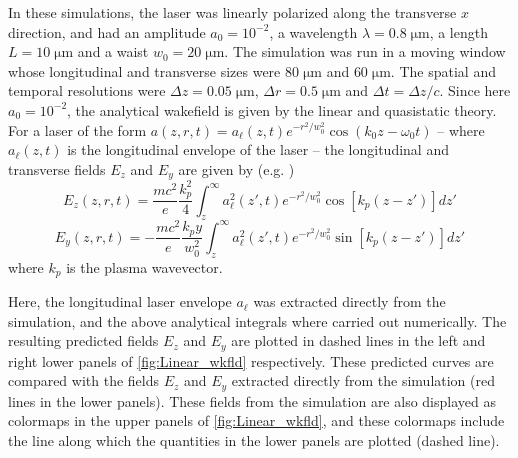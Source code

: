 \documentclass[1p,times,authoryear]{elsarticle}
\begin{document}
In these simulations, the laser was linearly polarized along the
transverse $x$ direction, and had an amplitude $a_0 = 10^{-2}$, a
wavelength $\lambda=0.8 \;\mathrm{\mu m}$, a length $L=10\;\mathrm{\mu
m}$ and a waist $w_0 = 20\;\mathrm{\mu m}$. The simulation was run in
a moving window whose longitudinal and transverse sizes were $80 \;
\mathrm{\mu m}$ and $60 \; \mathrm{\mu m}$. The spatial and temporal
resolutions were $\Delta z = 0.05 \; \mathrm{\mu m}$, $\Delta r = 0.5
\;\mathrm{\mu m}$ and $\Delta t = \Delta z/c$. Since here $a_0 =
10^{-2}$, the analytical wakefield is given by
the linear and quasistatic theory. For a laser of the
form $a(z, r, t)= a_\ell(z, t) e^{-r^2/w_0^2} \cos(k_0z-\omega_0 t)$ --
where $a_\ell(z, t)$ is the longitudinal envelope of the laser -- the
longitudinal and transverse fields $E_z$ and $E_y$ are given by (e.g. \citep{EsareyRMP2009})
\begin{equation} 
E_z(z, r, t) = \frac{mc^2}{e} \frac{k_p^2}{4}\int_{z}^{\infty} 
a_\ell^2(z', t) e^{-r^2/w_0^2} \cos[k_p(z-z')]dz' \label{eq:analytical-Ez}
\end{equation}
\begin{equation}
E_y(z, r, t) = -\frac{mc^2}{e} \frac{k_p y}{w_0^2}\int_{z}^{\infty} 
a_\ell^2(z', t) e^{-r^2/w_0^2} \sin[k_p(z-z')]dz' \label{eq:analytical-Ey}
\end{equation}
\noindent where $k_p$ is the plasma wavevector.

Here, the longitudinal laser envelope $a_\ell$ was extracted directly from the
simulation, and the above analytical integrals where carried out
numerically. The resulting predicted fields $E_z$ and $E_y$ are plotted in dashed lines
in the left and right lower panels of \cref{fig:Linear_wkfld}
respectively. These predicted curves are compared with
the fields $E_z$ and $E_y$ extracted directly from the simulation (red
lines in the lower panels). These fields from the simulation are also
displayed as colormaps in the upper panels of \cref{fig:Linear_wkfld},
and these colormaps include the line along which the quantities in the
lower panels are plotted (dashed line).
\end{document}
